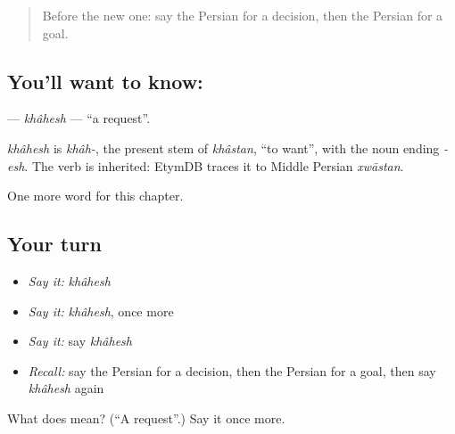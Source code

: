 \begin{quote}
Before the new one: say the Persian for a decision, then the Persian for a goal.
\end{quote}

\subsection*{You'll want to know: }
\textbf{} — \emph{khâhesh} — \textquotedblleft{}a request\textquotedblright{}.

\begin{cousinweb}
\emph{khâhesh} is \emph{khâh-}, the present stem of \emph{khâstan}, \textquotedblleft{}to want\textquotedblright{}, with the noun ending \emph{-esh}. The verb is inherited: EtymDB traces it to Middle Persian \emph{xwāstan}.
\end{cousinweb}

\begin{grammarlens}[title={What you've built}]
One more word for this chapter.
\end{grammarlens}

\subsection*{Your turn}
\begin{itemize}
\raggedright
  \item \emph{Say it:} \emph{khâhesh}
  \item \emph{Say it:} \emph{khâhesh}, once more
  \item \emph{Say it:} say \emph{khâhesh}
  \item \emph{Recall:} say the Persian for a decision, then the Persian for a goal, then say \emph{khâhesh} again
\end{itemize}

\begin{tcolorbox}[breakable,colback=teal!4,colframe=teal!35!black,title={Before you move on}]
What does  mean? (\textquotedblleft{}A request\textquotedblright{}.) Say it once more.
\end{tcolorbox}

